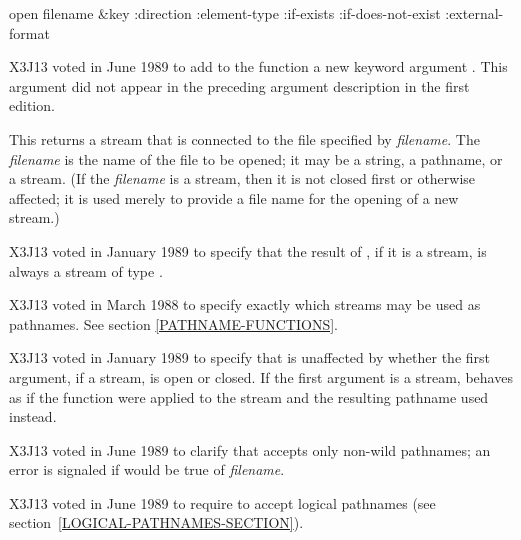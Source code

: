 \begin{defun}[Function]
open filename &key :direction :element-type :if-exists :if-does-not-exist :external-format

\begin{newer}
X3J13 voted in June 1989 
to add to the function  a new keyword argument .
This argument did not appear in the preceding argument description in the
first edition.
\end{newer}

This returns a stream that is connected to the file specified by \emph{filename}.
The \emph{filename} is the name of the file to be opened; it may be a string,
a pathname, or a stream.  (If the \emph{filename} is a stream, then it is not
closed first or otherwise affected; it is used merely to provide a file name
for the opening of a new stream.)

\begin{new}
X3J13 voted in January 1989
to specify that the result of
, if it is a stream, is always a stream of type .
\end{new}

\begin{new}
X3J13 voted in March 1988
to specify exactly which streams may be used as pathnames.
See section \ref{PATHNAME-FUNCTIONS}.
\end{new}

\begin{new}
X3J13 voted in January 1989
to specify that  is unaffected by
whether the first argument, if a stream, is open or closed. If the first
argument is a stream,  behaves as if the function 
were applied to the stream and the resulting pathname used instead.
\end{new}

\begin{newer}
X3J13 voted in June 1989 
to clarify that  accepts only non-wild pathnames;
an error is signaled if  would be true of \emph{filename}.
\end{newer}

\begin{newer}
X3J13 voted in June 1989  to require 
to accept logical pathnames (see section~\ref{LOGICAL-PATHNAMES-SECTION}).
\end{newer}


\end{defun}
